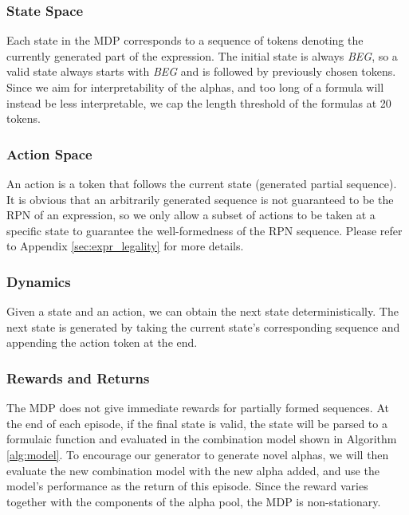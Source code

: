 \subsubsection{State Space}

Each state in the MDP corresponds to a sequence of tokens denoting the currently generated part of the expression. The initial state is always \emph{BEG}, so a valid state always starts with \emph{BEG} and is followed by previously chosen tokens. Since we aim for interpretability of the alphas, and too long of a formula will instead be less interpretable, we cap the length threshold of the formulas at 20 tokens.

\subsubsection{Action Space} \label{sec:action_space}

An action is a token that follows the current state (generated partial sequence). It is obvious that an arbitrarily generated sequence is not guaranteed to be the RPN of an expression, so we only allow a subset of actions to be taken at a specific state to guarantee the well-formedness of the RPN sequence. Please refer to Appendix \ref{sec:expr_legality} for more details.

\subsubsection{Dynamics}

Given a state and an action, we can obtain the next state deterministically. The next state is generated by taking the current state's corresponding sequence and appending the action token at the end.

\subsubsection{Rewards and Returns}

The MDP does not give immediate rewards for partially formed sequences. At the end of each episode, if the final state is valid, the state will be parsed to a formulaic function and evaluated in the combination model shown in Algorithm \ref{alg:model}. To encourage our generator to generate novel alphas, we will then evaluate the new combination model with the new alpha added, and use the model's performance as the return of this episode. Since the reward varies together with the components of the alpha pool, the MDP is non-stationary.

